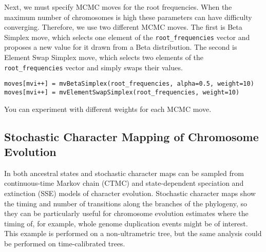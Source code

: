 Next, we must specify MCMC moves for the root frequencies.
When the maximum number of chromosomes is high these parameters
can have difficulty converging.
Therefore, we use two different MCMC moves. The first is Beta Simplex move, which selects one
element of the \texttt{root\_frequencies} vector and proposes
a new value for it drawn from a Beta distribution.
The second is Element Swap Simplex move, which selects two elements
of the \texttt{root\_frequencies} vector and simply swaps their values.
{\tt \begin{snugshade*}
\begin{lstlisting}
moves[mvi++] = mvBetaSimplex(root_frequencies, alpha=0.5, weight=10)
moves[mvi++] = mvElementSwapSimplex(root_frequencies, weight=10)
\end{lstlisting}
\end{snugshade*}}
You can experiment with different weights for each MCMC move.


\medskip
\subsection{Stochastic Character Mapping of Chromosome Evolution}\label{subsect:stoch_mapping}


In \RevBayes both ancestral states and stochastic character maps can be sampled from
continuous-time Markov chain (CTMC) and state-dependent speciation and
extinction (SSE) models of character evolution.
Stochastic character maps show the timing and number of transitions
along the branches of the phylogeny, so they can be particularly useful
for chromosome evolution estimates where the timing of, for example, whole genome duplication events
might be of interest. This example is performed on a non-ultrametric tree, but
the same analysis could be performed on time-calibrated trees.

\begin{figure}[h!]
\label{fig:simmap}
\end{figure}


